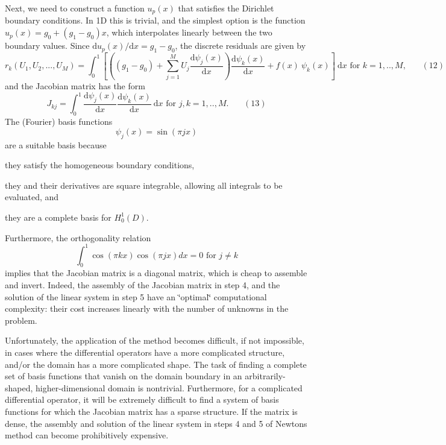 Next, we need to construct a function $u_p(x)$ that satisfies the Dirichlet boundary conditions. In 1D this is trivial, and the simplest option is the function $ u_p(x)=g_0+ (g_1-g_0) x$, which interpolates linearly between the two boundary values. Since $ \mbox{d}u_p(x)/ \mbox{d} x = g_1-g_0$, the discrete residuals are given by \[ r_k(U_1,U_2,...,U_M) = \int_0^1 \left[ \left( (g_1 - g_0) + \sum_{j=1}^{M} U_j \frac{\mbox{d} \psi_j(x)}{\mbox{d} x} \right) \frac{\mbox{d} \psi_k(x)}{\mbox{d} x} + f(x) \ \psi_k(x) \right] \ \mbox{d}x \mbox{\ \ for $k=1,..,M$}, \ \ \ \ \ \ \ \ (12) \] and the Jacobian matrix has the form \[ J_{kj} = \int_0^1 \frac{\mbox{d} \psi_j(x)}{\mbox{d} x} \frac{\mbox{d} \psi_k(x)}{\mbox{d} x} \ \mbox{d}x \mbox{\ \ for $j,k=1,..,M$}. \ \ \ \ \ \ \ \ (13) \] The (Fourier) basis functions \[ \psi_j(x) = \sin\left(\pi j x \right)\] are a suitable basis because
\begin{DoxyItemize}
\item they satisfy the homogeneous boundary conditions,
\item they and their derivatives are square integrable, allowing all integrals to be evaluated, and
\item they are a complete basis for $ H^1_0(D)$.
\end{DoxyItemize}Furthermore, the orthogonality relation \[ \int_0^1 \cos\left(\pi k x\right) \cos\left(\pi j x\right) dx = 0 \mbox{\ \ \ for \ } j\ne k \] implies that the Jacobian matrix is a diagonal matrix, which is cheap to assemble and invert. Indeed, the assembly of the Jacobian matrix in step 4, and the solution of the linear system in step 5 have an \char`\"{}optimal\char`\"{} computational complexity\+: their cost increases linearly with the number of unknowns in the problem.

Unfortunately, the application of the method becomes difficult, if not impossible, in cases where the differential operators have a more complicated structure, and/or the domain has a more complicated shape. The task of finding a complete set of basis functions that vanish on the domain boundary in an arbitrarily-\/shaped, higher-\/dimensional domain is nontrivial. Furthermore, for a complicated differential operator, it will be extremely difficult to find a system of basis functions for which the Jacobian matrix has a sparse structure. If the matrix is dense, the assembly and solution of the linear system in steps 4 and 5 of Newton\textquotesingle{}s method can become prohibitively expensive.

